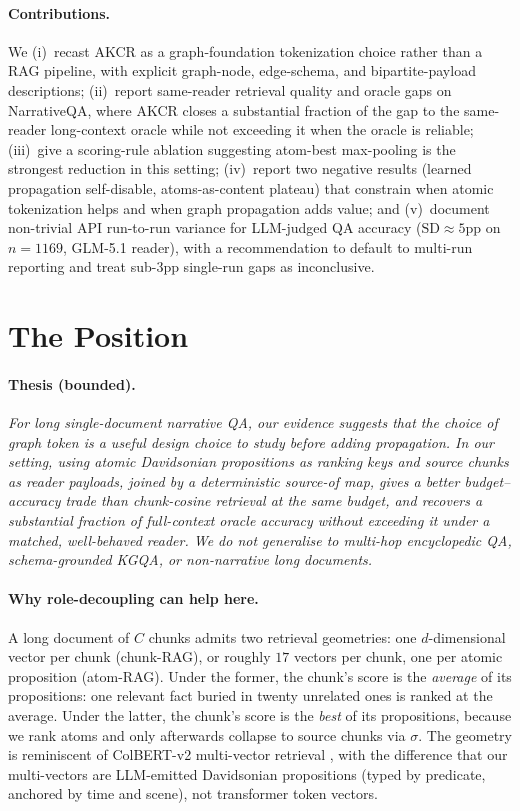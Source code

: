 \documentclass{article}
\theoremstyle{plain}
\theoremstyle{definition}
\theoremstyle{remark}
\begin{document}
\paragraph{Contributions.}
We (i)~recast AKCR as a graph-foundation tokenization choice rather than a
RAG pipeline, with explicit graph-node, edge-schema, and bipartite-payload
descriptions; (ii)~report same-reader retrieval quality and oracle gaps on
NarrativeQA, where AKCR closes a substantial fraction of the gap to the
same-reader long-context oracle while not exceeding it when the oracle is
reliable; (iii)~give a scoring-rule ablation suggesting atom-best
max-pooling is the strongest reduction in this setting; (iv)~report two
negative results (learned propagation self-disable, atoms-as-content
plateau) that constrain when atomic tokenization helps and when graph
propagation adds value; and (v)~document non-trivial API run-to-run variance
for LLM-judged QA accuracy ($\mathrm{SD}\!\approx\!5$pp on $n=1169$,
GLM-5.1 reader), with a recommendation to default to multi-run reporting
and treat sub-3pp single-run gaps as inconclusive.

\section{The Position}
\label{sec:position}

\paragraph{Thesis (bounded).} \emph{For long single-document narrative QA,
our evidence suggests that the choice of graph token is a useful design
choice to study before adding propagation. In our setting, using atomic
Davidsonian propositions as ranking keys and source chunks as reader
payloads, joined by a deterministic source-of map, gives a better
budget--accuracy trade than chunk-cosine retrieval at the same budget, and
recovers a substantial fraction of full-context oracle accuracy without
exceeding it under a matched, well-behaved reader. We do not generalise to
multi-hop encyclopedic QA, schema-grounded KGQA, or non-narrative long
documents.}

\paragraph{Why role-decoupling can help here.} A long document of $C$ chunks
admits two retrieval geometries: one $d$-dimensional vector per chunk
(chunk-RAG), or roughly $17$ vectors per chunk, one per atomic proposition
(atom-RAG). Under the former, the chunk's score is the \emph{average} of
its propositions: one relevant fact buried in twenty unrelated ones is ranked
at the average. Under the latter, the chunk's score is the \emph{best} of its
propositions, because we rank atoms and only afterwards collapse to source
chunks via $\sigma$. The geometry is reminiscent of ColBERT-v2 multi-vector
retrieval \citep{khattab2022colbertv2}, with the difference that our
multi-vectors are LLM-emitted Davidsonian propositions (typed by predicate,
anchored by time and scene), not transformer token vectors.
\end{document}
